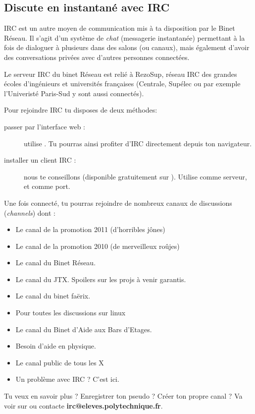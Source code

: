 
\subsection{Discute en instantané avec IRC}

\label{irc}

IRC est un autre moyen de communication mis à ta disposition par le Binet Réseau.
Il s'agit d'un système de \emph{chat} (messagerie instantanée) permettant à la fois de dialoguer à plusieurs dans des salons (ou canaux),
mais également d'avoir des conversations privées avec d'autres personnes connectées.


Le serveur IRC du binet Réseau est relié à RezoSup, réseau IRC des grandes écoles d'ingénieurs et universités françaises (Centrale, Supélec ou par exemple l'Univeristé Paris-Sud y sont aussi connectés).

Pour rejoindre IRC tu disposes de deux méthodes:

                  
\begin{description}
  \item[passer par l'interface web :] utilise . Tu pourras ainsi profiter d'IRC directement depuis ton navigateur.
  \item[installer un client IRC :] nous te conseillons  (disponible gratuitement sur \linebreak {}). Utilise   comme serveur, et  comme port.
\end{description}

 
Une fois connecté, tu pourras rejoindre de nombreux canaux de discussions (\emph{channels}) dont :
\begin{itemize}
  \item {} Le canal de la promotion 2011 (d'horribles jônes)
  \item {} Le canal de la promotion 2010 (de merveilleux roûjes)
  \item {} Le canal du Binet Réseau.
  \item {} Le canal du JTX. Spoilers sur les projs à venir garantis.
  \item {} Le canal du binet fa\"erix.
  \item {} Pour toutes les discussions sur linux
  \item {} Le canal du Binet d'Aide aux Bars d'Etages.
  \item {} Besoin d'aide en physique.
  \item {} Le canal public de tous les X
  \item {} Un problème avec IRC ? C'est ici.
\end{itemize}

 Tu veux en savoir plus ? Enregistrer ton pseudo ? Créer ton propre canal ? Va voir sur  ou contacte \textbf{irc@eleves.polytechnique.fr}.


